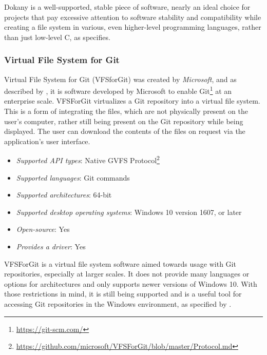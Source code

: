 Dokany is a well-supported, stable piece of software, nearly an ideal choice for projects that pay excessive attention to software stability and compatibility while creating a file system in various, even higher-level programming languages, rather than just low-level C, as \cite{DokanDevIo} specifies.

\subsubsection{Virtual File System for Git}
Virtual File System for Git (VFSforGit) was created by \textit{Microsoft}, and as described by \cite{GitVfsForGit}, it is software developed by Microsoft to enable Git\footnote{\url{https://git-scm.com/}} at an enterprise scale. VFSForGit virtualizes a Git repository into a virtual file system. This is a form of integrating the files, which are not physically present on the user's computer, rather still being present on the Git repository while being displayed. The user can download the contents of the files on request via the application's user interface. 
\begin{itemize}
    \item \textit{Supported API types}: Native GVFS Protocol\footnote{\url{https://github.com/microsoft/VFSForGit/blob/master/Protocol.md}}
    \item \textit{Supported languages}: Git commands
    \item \textit{Supported architectures}: 64-bit
    \item \textit{Supported desktop operating systems}: Windows 10 version 1607, or later
    \item \textit{Open-source}: Yes
    \item \textit{Provides a driver}: Yes
\end{itemize}


VFSForGit is a virtual file system software aimed towards usage with Git repositories, especially at larger scales. It does not provide many languages or options for architectures and only supports newer versions of Windows 10. With those restrictions in mind, it is still being supported and is a useful tool for accessing Git repositories in the Windows environment, as specified by \cite{VfsForGitMS}.

